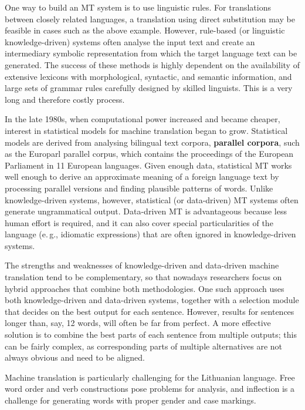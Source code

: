 \documentclass[]{../metanetpaper}
\begin{document}
\begin{multicols}{2}
One way to build an MT system is to use linguistic rules. For translations between closely related languages, a translation using direct substitution may be feasible in cases such as the above example. However, rule-based (or linguistic knowledge-driven) systems often analyse the input text and create an intermediary symbolic representation from which the target language text can be generated. The success of these methods is highly dependent on the availability of extensive lexicons with morphological, syntactic, and semantic information, and large sets of grammar rules carefully designed by skilled linguists. This is a very long and therefore costly process.

In the late 1980s, when computational power increased and became cheaper, interest in statistical models for machine translation began to grow. Statistical models are derived from analysing bilingual text corpora, \textbf{parallel corpora}, such as the Europarl parallel corpus, which contains the proceedings of the European Parliament in 11 European languages. Given enough data, statistical MT works well enough to derive an approximate meaning of a foreign language text by processing parallel versions and finding plausible patterns of words. Unlike knowledge-driven systems, however, statistical (or data-driven) MT systems often generate ungrammatical output. Data-driven MT is advantageous because less human effort is required, and it can also cover special particularities of the language (e.\,g., idiomatic expressions) that are often ignored in knowledge-driven systems. 

The strengths and weaknesses of knowledge-driven and data-driven machine translation tend to be complementary, so that nowadays researchers focus on hybrid approaches that combine both methodologies. One such approach uses both knowledge-driven and data-driven systems, together with a selection module that decides on the best output for each sentence. However, results for sentences longer than, say, 12 words, will often be far from perfect. A more effective solution is to combine the best parts of each sentence from multiple outputs; this can be fairly complex, as corresponding parts of multiple alternatives are not always obvious and need to be aligned. 


Machine translation is particularly challenging for the Lithuanian language. Free word order and verb constructions pose problems for analysis, and inflection is a challenge for generating words with proper gender and case markings. 


\end{multicols}
\end{document}
